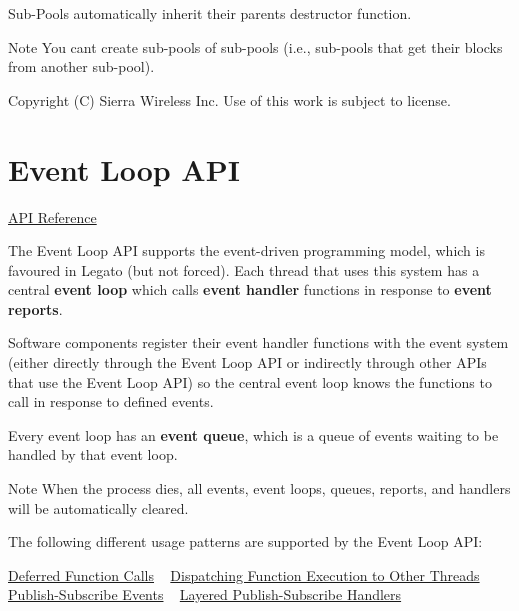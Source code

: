 Sub-\/\+Pools automatically inherit their parent\textquotesingle{}s destructor function.

\begin{DoxyNote}{Note}
You can\textquotesingle{}t create sub-\/pools of sub-\/pools (i.\+e., sub-\/pools that get their blocks from another sub-\/pool).
\end{DoxyNote}




Copyright (C) Sierra Wireless Inc. Use of this work is subject to license. \hypertarget{c_eventLoop}{}\section{Event Loop A\+P\+I}\label{c_eventLoop}
\hyperlink{le__event_loop_8h}{A\+P\+I Reference}





The Event Loop A\+P\+I supports the event-\/driven programming model, which is favoured in Legato (but not forced). Each thread that uses this system has a central {\bfseries event loop} which calls {\bfseries event handler} functions in response to {\bfseries event reports}.

Software components register their event handler functions with the event system (either directly through the Event Loop A\+P\+I or indirectly through other A\+P\+Is that use the Event Loop A\+P\+I) so the central event loop knows the functions to call in response to defined events.

Every event loop has an {\bfseries event queue}, which is a queue of events waiting to be handled by that event loop.

\begin{DoxyNote}{Note}
When the process dies, all events, event loops, queues, reports, and handlers will be automatically cleared.
\end{DoxyNote}
The following different usage patterns are supported by the Event Loop A\+P\+I\+:

\hyperlink{c_event_loop_c_event_deferredFunctionCalls}{Deferred Function Calls} ~\newline
 \hyperlink{c_event_loop_c_event_dispatchingToOtherThreads}{Dispatching Function Execution to Other Threads} ~\newline
 \hyperlink{c_event_loop_c_event_publishSubscribe}{Publish-\/\+Subscribe Events} ~\newline
 \hyperlink{c_event_loop_c_event_layeredPublishSubscribe}{Layered Publish-\/\+Subscribe Handlers} ~\newline


